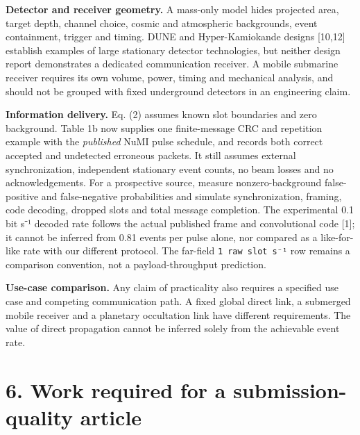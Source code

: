 \documentclass[
]{article}
\begin{document}
\textbf{Detector and receiver geometry.} A mass-only model hides
projected area, target depth, channel choice, cosmic and atmospheric
backgrounds, event containment, trigger and timing. DUNE and
Hyper-Kamiokande designs {[}10,12{]} establish examples of large
stationary detector technologies, but neither design report demonstrates
a dedicated communication receiver. A mobile submarine receiver requires
its own volume, power, timing and mechanical analysis, and should not be
grouped with fixed underground detectors in an engineering claim.

\textbf{Information delivery.} Eq. (2) assumes known slot boundaries and
zero background. Table 1b now supplies one finite-message CRC and
repetition example with the \emph{published} NuMI pulse schedule, and
records both correct accepted and undetected erroneous packets. It still
assumes external synchronization, independent stationary event counts,
no beam losses and no acknowledgements. For a prospective source,
measure nonzero-background false-positive and false-negative
probabilities and simulate synchronization, framing, code decoding,
dropped slots and total message completion. The experimental 0.1 bit s⁻¹
decoded rate follows the actual published frame and convolutional code
{[}1{]}; it cannot be inferred from 0.81 events per pulse alone, nor
compared as a like-for-like rate with our different protocol. The
far-field \texttt{1\ raw\ slot\ s⁻¹} row remains a comparison
convention, not a payload-throughput prediction.

\textbf{Use-case comparison.} Any claim of practicality also requires a
specified use case and competing communication path. A fixed global
direct link, a submerged mobile receiver and a planetary occultation
link have different requirements. The value of direct propagation cannot
be inferred solely from the achievable event rate.

\hypertarget{work-required-for-a-submission-quality-article}{%
\section{6. Work required for a submission-quality
article}\label{work-required-for-a-submission-quality-article}}
\end{document}
